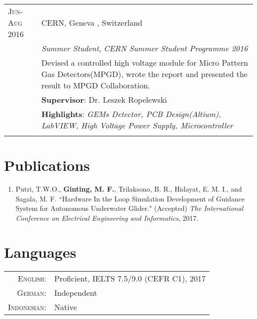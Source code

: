 \documentclass[a4paper,10pt]{article} %
\begin{document}
\begin{tabular}{lp{12cm}}

\textsc{Jun-Aug 2016} & \textsc{CERN}, Geneva , Switzerland \\
& \emph{Summer Student}, \textit{CERN Summer Student Programme 2016}\\ 
& \footnotesize{Devised a controlled high voltage module for Micro Pattern Gas Detectors(MPGD), wrote the report and presented the result to MPGD Collaboration.}\\
& \footnotesize{\textbf{Supervisor}: Dr. Leszek Ropelewski}\\
& \footnotesize{\textbf{Highlights}: \textit{GEMs Detector, PCB Design(Altium),  LabVIEW, High Voltage Power Supply, Microcontroller}}\\
\multicolumn{2}{c}{} \\
\end{tabular}

\vspace{-4mm}
\section{Publications}
\begin{enumerate}
  \item Putri, T.W.O., {\bf Ginting, M. F.}, Trilaksono, B. R., Hidayat, E. M. I., and Sagala, M. F.  ``Hardware In the Loop Simulation Development of Guidance System for Autonomous Underwater Glider." (Accepted) 
\emph{The International Conference on Electrical Engineering and Informatics}, 2017.
\end{enumerate}


\vspace{-4mm}
\section{Languages}

\begin{tabular}{rl}
\textsc{English:} & Proficient, IELTS 7.5/9.0 (CEFR C1), 2017\\

\textsc{German:} & Independent\\
\textsc{Indonesian:} & Native\\

\end{tabular}
\end{document}
